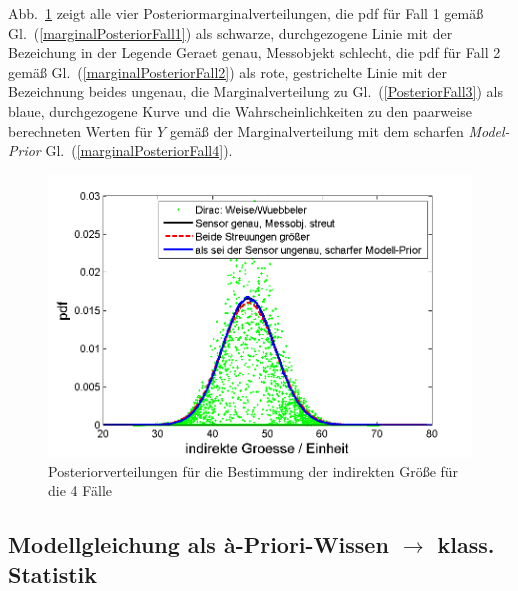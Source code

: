 Abb.~\ref{fig:Posteriorverteilungen_4Faelle} zeigt alle vier Posteriormarginalverteilungen,
die pdf für Fall 1 gemäß Gl.~(\ref{marginalPosteriorFall1}) als schwarze, durchgezogene Linie mit
der Bezeichung in der Legende \glqq Geraet genau, Messobjekt schlecht\grqq, die pdf für
Fall 2 gemäß Gl.~(\ref{marginalPosteriorFall2}) als rote, gestrichelte Linie mit der
Bezeichnung \glqq beides ungenau\grqq, die Marginalverteilung
zu Gl.~(\ref{PosteriorFall3}) als blaue, durchgezogene Kurve und die
Wahrscheinlichkeiten zu den paarweise berechneten Werten für $Y$ gemäß der Marginalverteilung
mit dem scharfen \textsl{Model-Prior} Gl.~(\ref{marginalPosteriorFall4}).
\begin{figure}[!htb]
	\begin{center}
		\includegraphics[width=130mm]{10_vorlesung/media/Posterior_all.png}
		\caption{Posteriorverteilungen für die Bestimmung der
			indirekten Größe für die 4 Fälle}
		\label{fig:Posteriorverteilungen_4Faelle}
	\end{center}
\end{figure}

\newpage

\subsection{Modellgleichung als {\`a}-Priori-Wissen $\rightarrow$  klass. Statistik}

